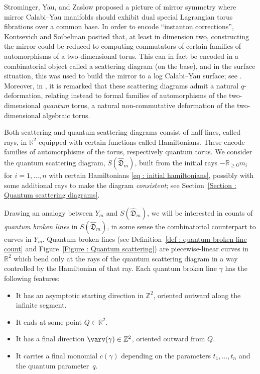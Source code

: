 \documentclass[11pt]{amsart}
\numberwithin{equation}{section}
\theoremstyle{plain}
\theoremstyle{remark}
\theoremstyle{definition}
\newcommand\fD{\mathfrak D}
\newcommand{\RR}{\mathbb{R}}
\newcommand{\ZZ}{\mathbb{Z}}
\begin{document}
Strominger, Yau, and Zaslow \cite{strominger1996mirror} proposed a picture of mirror symmetry where mirror Calabi--Yau manifolds should exhibit dual special Lagrangian torus fibrations over a common base. In order to encode ``instanton corrections'', Kontsevich and Soibelman \cite{kontsevich2006affine} posited that, at least in dimension two, constructing the mirror could be reduced to computing commutators of certain families of automorphisms of a two-dimensional torus. This can in fact be encoded in a combinatorial object called a scattering diagram (on the base), and in the surface situation, this was used to build the mirror to a log Calabi--Yau surface; see \cite{gross2015mirror}. Moreover, in \cite[Section 11.8]{kontsevich2006affine}, it is remarked that these scattering diagrams admit a natural $q$-deformation, relating instead to formal families of automorphisms of the two-dimensional \emph{quantum} torus, a natural non-commutative deformation of the two-dimensional algebraic torus. 

Both scattering and quantum scattering diagrams consist of half-lines, called rays, in $\RR^2$ equipped with certain functions called Hamiltonians. These encode families of automorphisms of the torus, respectively quantum torus. We consider the quantum scattering diagram, $S(\hat{\fD}_m)$, built from the initial rays $-\RR_{\geq 0}m_i$ for $i=1,\dots,n$ with certain Hamiltonians \eqref{eq : initial hamiltonians}, possibly with some additional rays to make the diagram \emph{consistent}; see Section~\ref{Section : Quantum scattering diagrams}. 

Drawing an analogy between $Y_m$ and $S(\hat{\fD}_m)$, we will be interested in counts of \emph{quantum broken lines} in $S(\hat{\fD}_m)$, in some sense the combinatorial counterpart to curves in $Y_m$. Quantum broken lines (see Definition~\ref{def : quantum broken line count} and Figure~\ref{Figure : Quantum scattering}) are piecewise-linear curves in $\RR^2$ which bend only at the rays of the quantum scattering diagram in a way controlled by the Hamiltonian of that ray. Each quantum broken line $\gamma$ has the following features:  
\begin{itemize}
    \item It has an asymptotic starting direction in $\mathbb{Z}^2$, oriented outward along the infinite segment.  
    \item It ends at some point $Q \in \mathbb{R}^2$. 
    \item It has a final direction $\varv(\gamma) \in \ZZ^2$, oriented outward from $Q$.
    \item It carries a final monomial $c(\gamma)$ depending on the parameters $t_1,\dots,t_n$ and the quantum pa\-ra\-meter~$q$.  
\end{itemize}
\end{document}
